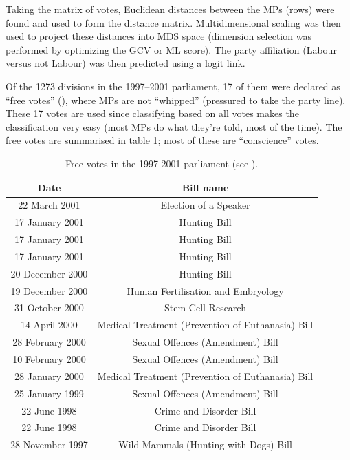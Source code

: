 Taking the matrix of votes, Euclidean distances between the MPs (rows) were found and used to form the distance matrix. Multidimensional scaling was then used to project these distances into MDS space (dimension selection was performed by optimizing the GCV or ML score). The party affiliation (Labour versus not Labour) was then predicted using a logit link.

Of the 1273 divisions in the 1997--2001 parliament, 17 of them were declared  as ``free votes'' (\cite{freevotes}), where MPs are not ``whipped'' (pressured to take the party line). These 17 votes are used since classifying based on all votes makes the classification very easy (most MPs do what they're told, most of the time). The free votes are summarised in table \ref{free-vote-description}; most of these are ``conscience'' votes.

\begin{table}  
\begin{centering}
\begin{tabular}{cc}
	Date & Bill name \\
    \hline
22 March 2001    &   Election of a Speaker \\
17 January 2001  &   Hunting Bill \\
17 January 2001  &   Hunting Bill \\
17 January 2001  &   Hunting Bill\\
20 December 2000 &   Hunting Bill \\
19 December 2000 &   Human Fertilisation and Embryology\\
31 October 2000  &   Stem Cell Research \\
14 April 2000    &   Medical Treatment (Prevention of Euthanasia) Bill \\
28 February 2000 &   Sexual Offences (Amendment) Bill \\
10 February 2000 &   Sexual Offences (Amendment) Bill \\
28 January 2000  &   Medical Treatment (Prevention of Euthanasia) Bill\\
25 January 1999  &   Sexual Offences (Amendment) Bill\\
22 June 1998     &  Crime and Disorder Bill \\
22 June 1998     &  Crime and Disorder Bill \\
28 November 1997 &  Wild Mammals (Hunting with Dogs) Bill\\
  \end{tabular}
\caption{Free votes in the 1997-2001 parliament (see \cite{freevotes}).}
\end{centering}
\label{free-vote-description}
\end{table}


